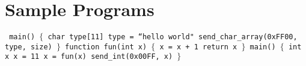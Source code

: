 \documentclass[letterpaper, 12pt]{article}
\begin{document}
\section{Sample Programs}
\texttt{ 
main()
\newline
$\{$
\newline
  char type[11]
\newline
  type = ``hello world"
\newline
  send\_char\_array(0xFF00, type, size)
\newline
$\}$
\newline
\newline
function fun(int x)
\newline
$\{$
\newline
  x = x + 1
\newline
  return x
\newline
$\}$
\newline
main()
\newline
$\{$
\newline
  int x
\newline
  x = 11
\newline
  x = fun(x)
\newline
  send\_int(0x00FF, x)
\newline
$\}$
\newline
}
\end{document}
